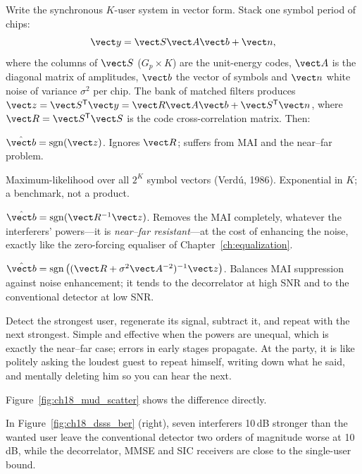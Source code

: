 Write the synchronous $K$-user system in vector form. Stack one symbol period of chips:
\begin{equation}
\vect y=\vect S\vect A\vect b+\vect n,
\end{equation}
where the columns of $\vect S$ ($G_p\times K$) are the unit-energy codes, $\vect A$ is the
diagonal matrix of amplitudes, $\vect b$ the vector of symbols and $\vect n$ white noise of
variance $\sigma^2$ per chip. The bank of matched filters produces
$\vect z=\vect S^{\mathsf T}\vect y=\vect R\vect A\vect b+\vect S^{\mathsf T}\vect n$, where
$\vect R=\vect S^{\mathsf T}\vect S$ is the code cross-correlation matrix. Then:
\begin{description}[style=nextline,leftmargin=1.2em,font=\sffamily\bfseries\small\color{navy}]
\item[Conventional detector.] $\hat{\vect b}=\operatorname{sgn}(\vect z)$. Ignores $\vect R$;
suffers from MAI and the near--far problem.
\item[Optimum detector.] Maximum-likelihood over all $2^K$ symbol vectors (Verd\'u, 1986).
Exponential in $K$; a benchmark, not a product.
\item[Decorrelator.] $\hat{\vect b}=\operatorname{sgn}(\vect R^{-1}\vect z)$. Removes the
MAI completely, whatever the interferers' powers---it is \emph{near--far resistant}---at
the cost of enhancing the noise, exactly like the zero-forcing equaliser of
Chapter~\ref{ch:equalization}.
\item[MMSE detector.] $\hat{\vect b}=\operatorname{sgn}\big((\vect R+\sigma^2\vect
A^{-2})^{-1}\vect z\big)$. Balances MAI suppression against noise enhancement; it tends to
the decorrelator at high SNR and to the conventional detector at low SNR.
\item[Successive interference cancellation (SIC).] Detect the strongest user, regenerate its
signal, subtract it, and repeat with the next strongest. Simple and effective when the powers
are unequal, which is exactly the near--far case; errors in early stages propagate. At the party,
it is like politely asking the loudest guest to repeat himself, writing down what he said, and
mentally deleting him so you can hear the next.
\end{description}
Figure~\ref{fig:ch18_mud_scatter} shows the difference directly.

In Figure~\ref{fig:ch18_dsss_ber} (right), seven interferers 10\,dB stronger than the wanted
user leave the conventional detector two orders of magnitude worse at 10\,dB, while the
decorrelator, MMSE and SIC receivers are close to the single-user bound.

